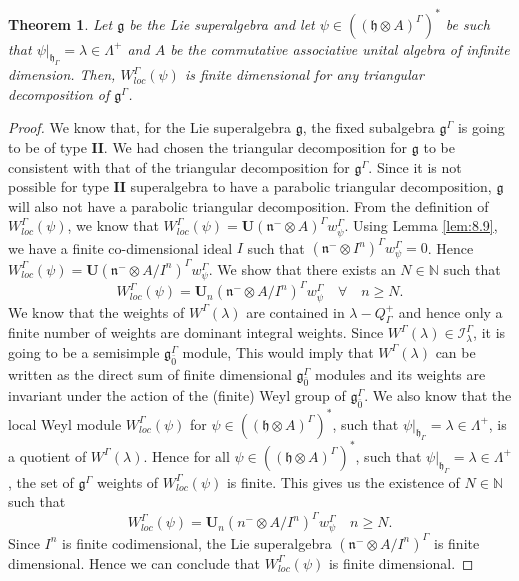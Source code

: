 \documentclass[11pt]{amsart}
\theoremstyle{plain}
\newtheorem{thm}{Theorem}[section]
\theoremstyle{definition}
\newcommand{\g}{\mathfrak{g}}
\newcommand{\h}{\mathfrak{h}}
\newcommand{\n}{\mathfrak{n}}
\newcommand{\lw}{w_{\psi}^{\Gamma}}
\newcommand{\LW}{W_{loc}^{\Gamma}(\psi)}
\begin{document}
\begin{thm}\label{thm:4}
Let $\g$ be the Lie superalgebra and let $\psi\in((\h\otimes A)^{\Gamma})^{*}$ be such that $\psi|_{\h_{\Gamma}}=\lambda\in\Lambda^{+}$ and $A$ be the commutative associative unital algebra of infinite dimension. Then, $\LW$ is finite dimensional for any triangular decomposition of $\g^{\Gamma}$.
\end{thm}
\begin{proof}
We know that, for the Lie superalgebra $\g$, the fixed subalgebra $\g^{\Gamma}$ is going to be of type $\textbf{II}$. We had chosen the triangular decomposition for $\g$ to be consistent with that of the triangular decomposition for $\g^{\Gamma}$. Since it is not possible for type $\textbf{II}$ superalgebra to have a parabolic triangular decomposition, $\g$ will also not have a parabolic triangular decomposition. From the definition of $\LW$, we know that $\LW=\mathbf{U}(\n^{-}\otimes A)^{\Gamma}\lw$. Using Lemma \ref{lem:8.9}, we have a finite co-dimensional ideal $I$ such that $(\n^{-}\otimes I^{n})^{\Gamma}\lw=0$. Hence $\LW=\mathbf{U}(\n^{-}\otimes A/I^{n})^{\Gamma}\lw$.  We show that there exists an $N\in\mathbb{N}$ such that 
\begin{equation*}
\LW=\mathbf{U}_{n}(\n^{-}\otimes A/I^{n})^{\Gamma}\lw \quad \forall\quad n\geq N.
\end{equation*}
We know that the weights of $W^{\Gamma}(\lambda)$ are contained in $\lambda-Q_{\Gamma}^{+}$ and hence only a finite number of weights are dominant integral weights. Since $W^{\Gamma}(\lambda)\in\mathcal{I}_{\lambda}^{\Gamma}$, it is going to be a semisimple $\g_{\bar{0}}^{\Gamma}$ module, This would imply that $W^{\Gamma}(\lambda)$ can be written as the direct sum of finite dimensional $\g_{\bar{0}}^{\Gamma}$ modules and its weights are invariant under the action of the (finite) Weyl group of $\g_{\bar{0}}^{\Gamma}$. We also know that the local Weyl module $W_{loc}^{\Gamma}(\psi)$ for $\psi\in((\h\otimes A)^{\Gamma})^{*}$, such that $\psi|_{\h_{\Gamma}}=\lambda\in\Lambda^{+}$, is a quotient of $W^{\Gamma}(\lambda)$. Hence for all $\psi\in((\h\otimes A)^{\Gamma})^{*}$, such that $\psi|_{\h_{\Gamma}}=\lambda\in\Lambda^{+}$, the set of $\g^{\Gamma}$ weights of $W_{loc}^{\Gamma}(\psi)$ is finite. This gives us the existence of $N\in\mathbb{N}$ such that
\begin{equation*}
        W^{\Gamma}_{loc}(\psi)=\mathbf{U}_{n}(n^{-}\otimes A/I^{n})^{\Gamma}\lw \quad n\geq N.
    \end{equation*}
Since $I^{n}$ is finite codimensional, the Lie superalgebra $(\n^{-}\otimes A/I^{n})^{\Gamma}$ is finite dimensional. Hence we can conclude that $\LW$ is finite dimensional.
\end{proof}
\end{document}

